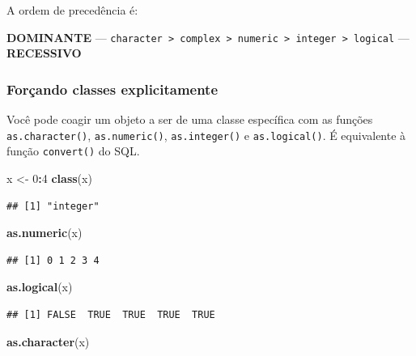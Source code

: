 \documentclass[
]{book}
\newenvironment{Shaded}{\begin{snugshade}}{\end{snugshade}}
\newcommand{\DecValTok}[1]{\textcolor[rgb]{0.00,0.00,0.81}{#1}}
\newcommand{\KeywordTok}[1]{\textcolor[rgb]{0.13,0.29,0.53}{\textbf{#1}}}
\newcommand{\NormalTok}[1]{#1}
\newcommand{\OperatorTok}[1]{\textcolor[rgb]{0.81,0.36,0.00}{\textbf{#1}}}
\newcommand{\StringTok}[1]{\textcolor[rgb]{0.31,0.60,0.02}{#1}}
\begin{document}
A ordem de precedência é:

\textbf{DOMINANTE} --- \texttt{character\ \textgreater{}\ complex\ \textgreater{}\ numeric\ \textgreater{}\ integer\ \textgreater{}\ logical} --- \textbf{RECESSIVO}

\hypertarget{foruxe7ando-classes-explicitamente}{%
\subsubsection{Forçando classes explicitamente}\label{foruxe7ando-classes-explicitamente}}

Você pode coagir um objeto a ser de uma classe específica com as funções \texttt{as.character()}, \texttt{as.numeric()}, \texttt{as.integer()} e \texttt{as.logical()}. É equivalente à função \texttt{convert()} do SQL.

\begin{Shaded}
\begin{Highlighting}[]
\NormalTok{x <{-}}\StringTok{ }\DecValTok{0}\OperatorTok{:}\DecValTok{4}
\KeywordTok{class}\NormalTok{(x)}
\end{Highlighting}
\end{Shaded}

\begin{verbatim}
## [1] "integer"
\end{verbatim}

\begin{Shaded}
\begin{Highlighting}[]
\KeywordTok{as.numeric}\NormalTok{(x)}
\end{Highlighting}
\end{Shaded}

\begin{verbatim}
## [1] 0 1 2 3 4
\end{verbatim}

\begin{Shaded}
\begin{Highlighting}[]
\KeywordTok{as.logical}\NormalTok{(x)}
\end{Highlighting}
\end{Shaded}

\begin{verbatim}
## [1] FALSE  TRUE  TRUE  TRUE  TRUE
\end{verbatim}

\begin{Shaded}
\begin{Highlighting}[]
\KeywordTok{as.character}\NormalTok{(x)}
\end{Highlighting}
\end{Shaded}
\end{document}
